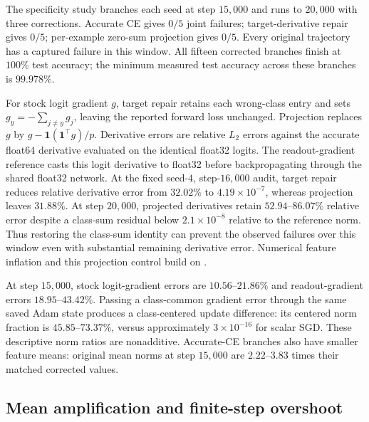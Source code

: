 The specificity study branches each seed at step $15{,}000$ and runs to $20{,}000$ with three corrections. Accurate CE gives $0/5$ joint failures; target-derivative repair gives $0/5$; per-example zero-sum projection gives $0/5$. Every original trajectory has a captured failure in this window. All fifteen corrected branches finish at $100\%$ test accuracy; the minimum measured test accuracy across these branches is $99.978\%$.

For stock logit gradient $g$, target repair retains each wrong-class entry and sets $g_y=-\sum_{j\ne y}g_j$, leaving the reported forward loss unchanged. Projection replaces $g$ by $g-\mathbf{1}(\mathbf{1}^{\top}g)/p$. Derivative errors are relative $L_2$ errors against the accurate float64 derivative evaluated on the identical float32 logits. The readout-gradient reference casts this logit derivative to float32 before backpropagating through the shared float32 network. At the fixed seed-$4$, step-$16{,}000$ audit, target repair reduces relative derivative error from $32.02\%$ to $4.19\times10^{-7}$, whereas projection leaves $31.88\%$. At step $20{,}000$, projected derivatives retain $52.94$--$86.07\%$ relative error despite a class-sum residual below $2.1\times10^{-8}$ relative to the reference norm. Thus restoring the class-sum identity can prevent the observed failures over this window even with substantial remaining derivative error. Numerical feature inflation and this projection control build on \citet{liu2026glitching}.

At step $15{,}000$, stock logit-gradient errors are $10.56$--$21.86\%$ and readout-gradient errors $18.95$--$43.42\%$. Passing a class-common gradient error through the same saved Adam state produces a class-centered update difference: its centered norm fraction is $45.85$--$73.37\%$, versus approximately $3\times10^{-16}$ for scalar SGD. These descriptive norm ratios are nonadditive. Accurate-CE branches also have smaller feature means: original mean norms at step $15{,}000$ are $2.22$--$3.83$ times their matched corrected values.

\subsection{Mean amplification and finite-step overshoot}
\label{app:mean-update}

